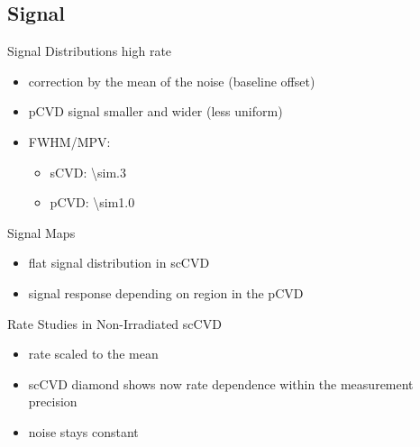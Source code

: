 \subsection{Signal}
\begin{frame}{Signal Distributions \@ high rate}
 
 \vspace*{-15pt}\vspace*{-10pt}

	\begin{itemize} \itemfill
		\item correction by the mean of the noise (baseline offset)
		\item pCVD signal smaller and wider (less uniform)
		\item FWHM/MPV:
		\begin{itemize}
			\item sCVD: \SI{\sim.3}{}
			\item pCVD: \SI{\sim1.0}{}
		\end{itemize}
	\end{itemize}
 
\end{frame}
\begin{frame}{Signal Maps}
	
	
	\begin{itemize} \itemfill
		\item flat signal distribution in scCVD
		\item signal response depending on region in the pCVD
	\end{itemize}
 
\end{frame}
\begin{frame}{Rate Studies in Non-Irradiated scCVD}

	
	
	\begin{itemize}\itemfill
		\item rate scaled to the mean
		\item scCVD diamond shows now rate dependence within the measurement precision
		\item noise stays constant
	\end{itemize}
	
\end{frame}
